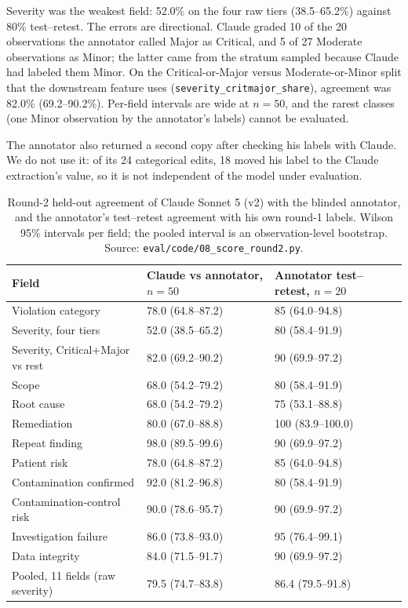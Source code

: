 \documentclass[12pt]{article}
\begin{document}
Severity was the weakest field: 52.0\% on the four raw tiers (38.5--65.2\%)
against 80\% test--retest. The errors are directional. Claude graded 10 of
the 20 observations the annotator called Major as Critical, and 5 of 27
Moderate observations as Minor; the latter came from the stratum sampled
because Claude had labeled them Minor. On the Critical-or-Major versus
Moderate-or-Minor split that the downstream feature uses
(\texttt{severity\_critmajor\_share}), agreement was 82.0\% (69.2--90.2\%).
Per-field intervals are wide at $n=50$, and the rarest classes (one Minor
observation by the annotator's labels) cannot be evaluated.

The annotator also returned a second copy after checking his labels with
Claude. We do not use it: of its 24 categorical edits, 18 moved his label
to the Claude extraction's value, so it is not independent of the model
under evaluation.

\begin{table}[ht]
\centering\small
\caption{Round-2 held-out agreement of Claude Sonnet 5 (v2) with the
blinded annotator, and the annotator's test--retest agreement with his own
round-1 labels. Wilson 95\% intervals per field; the pooled interval is
an observation-level bootstrap. Source:
\texttt{eval/code/08\_score\_round2.py}.}
\label{tab:round2}
\begin{tabular}{lll}\toprule
Field & Claude vs annotator, $n=50$ & Annotator test--retest, $n=20$ \\\midrule
Violation category & 78.0 (64.8--87.2) & 85 (64.0--94.8) \\
Severity, four tiers & 52.0 (38.5--65.2) & 80 (58.4--91.9) \\
Severity, Critical+Major vs rest & 82.0 (69.2--90.2) & 90 (69.9--97.2) \\
Scope & 68.0 (54.2--79.2) & 80 (58.4--91.9) \\
Root cause & 68.0 (54.2--79.2) & 75 (53.1--88.8) \\
Remediation & 80.0 (67.0--88.8) & 100 (83.9--100.0) \\
Repeat finding & 98.0 (89.5--99.6) & 90 (69.9--97.2) \\
Patient risk & 78.0 (64.8--87.2) & 85 (64.0--94.8) \\
Contamination confirmed & 92.0 (81.2--96.8) & 80 (58.4--91.9) \\
Contamination-control risk & 90.0 (78.6--95.7) & 90 (69.9--97.2) \\
Investigation failure & 86.0 (73.8--93.0) & 95 (76.4--99.1) \\
Data integrity & 84.0 (71.5--91.7) & 90 (69.9--97.2) \\\midrule
Pooled, 11 fields (raw severity) & 79.5 (74.7--83.8) & 86.4 (79.5--91.8) \\
\bottomrule\end{tabular}
\end{table}
\end{document}
